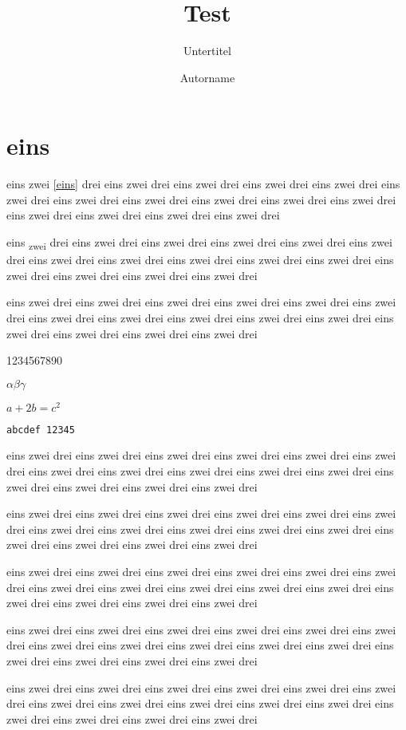 \documentclass[11pt, a4paper, bigheadings, twoside,
 notitlepage, halfparskip, tocleft, cleardoubleempty,
 noonelinecaption, origlongtable, german]{scrartcl}
\title{Test}
\subtitle{Untertitel} %
\author{Autorname} %
\begin{document}
  \maketitle

  \section{eins}\label{eins}

  eins zwei \autoref{eins} drei eins zwei drei eins zwei drei eins zwei drei eins zwei drei
  eins zwei drei eins zwei drei eins zwei drei eins zwei drei eins zwei drei
  eins zwei drei eins zwei drei eins zwei drei eins zwei drei eins zwei drei

  eins \textsubscript{zwei} drei eins zwei drei eins zwei drei eins zwei drei eins zwei drei
  eins zwei drei eins zwei drei eins zwei drei eins zwei drei eins zwei drei
  eins zwei drei eins zwei drei eins zwei drei eins zwei drei eins zwei drei

  eins zwei drei eins zwei drei eins zwei drei eins zwei drei eins zwei drei
  eins zwei drei eins zwei drei eins zwei drei eins zwei drei eins zwei drei
  eins zwei drei eins zwei drei eins zwei drei eins zwei drei eins zwei drei

  1234567890

  $\alpha \beta \gamma$

  $a+2b=c^2$

  \texttt{abcdef 12345}

  eins zwei drei eins zwei drei eins zwei drei eins zwei drei eins zwei drei
  eins zwei drei eins zwei drei eins zwei drei eins zwei drei eins zwei drei
  eins zwei drei eins zwei drei eins zwei drei eins zwei drei eins zwei drei

  eins zwei drei eins zwei drei eins zwei drei eins zwei drei eins zwei drei
  eins zwei drei eins zwei drei eins zwei drei eins zwei drei eins zwei drei
  eins zwei drei eins zwei drei eins zwei drei eins zwei drei eins zwei drei

  eins zwei drei eins zwei drei eins zwei drei eins zwei drei eins zwei drei
  eins zwei drei eins zwei drei eins zwei drei eins zwei drei eins zwei drei
  eins zwei drei eins zwei drei eins zwei drei eins zwei drei eins zwei drei

  eins zwei drei eins zwei drei eins zwei drei eins zwei drei eins zwei drei
  eins zwei drei eins zwei drei eins zwei drei eins zwei drei eins zwei drei
  eins zwei drei eins zwei drei eins zwei drei eins zwei drei eins zwei drei

  eins zwei drei eins zwei drei eins zwei drei eins zwei drei eins zwei drei
  eins zwei drei eins zwei drei eins zwei drei eins zwei drei eins zwei drei
  eins zwei drei eins zwei drei eins zwei drei eins zwei drei eins zwei drei

\end{document}
